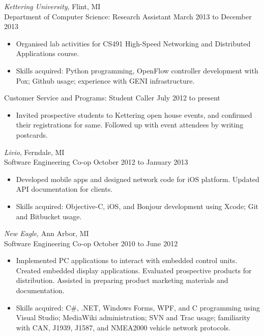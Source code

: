 \documentclass{res}
\begin{document}
\begin{resume}
{\sl Kettering University}, Flint, MI \\
Department of Computer Science: Research Assistant \hfill March 2013 to December 2013

   \begin{itemize} \itemsep -2pt
   \item Organised lab activities for CS491 High-Speed Networking and 
   Distributed Applications course.
   \item Skills acquired: Python programming, OpenFlow controller development
         with Pox; Github usage; experience with GENI infrastructure.
   \end{itemize}
Customer Service and Programs: Student Caller \hfill July 2012 to present

   \begin{itemize} \itemsep -2pt
   \item Invited prospective students to Kettering open house events, and 
   confirmed their registrations for same. 
         Followed up with event attendees by writing postcards.
   \end{itemize} 

   
{\sl Livio}, Ferndale, MI \\
Software Engineering Co-op       \hfill   October 2012 to January 2013
  
   \begin{itemize} \itemsep -2pt %
   \item Developed mobile apps and designed network code for iOS platform.
         Updated API documentation for clients. 
   \item Skills acquired: Objective-C, iOS, and Bonjour development using Xcode;
   Git and Bitbucket usage.
   \end{itemize}

{\sl New Eagle}, Ann Arbor, MI \\
Software Engineering Co-op \hfill October 2010 to June 2012

   \begin{itemize} \itemsep -2pt
   \item Implemented PC applications to interact with embedded control units.
            Created embedded display applications.
            Evaluated prospective products for distribution.
            Assisted in preparing product marketing materials and documentation.
   \item Skills acquired: C\#, .NET, Windows Forms, WPF, and C programming using
         Visual Studio; MediaWiki administration; SVN and Trac usage; 
         familiarity with CAN, J1939, J1587, and NMEA2000 vehicle network protocols.
   \end{itemize} 


\end{resume}
\end{document}
